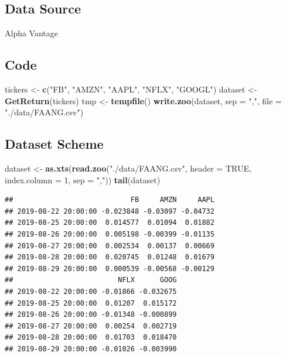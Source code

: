\documentclass[]{book}
\newenvironment{Shaded}{\begin{snugshade}}{\end{snugshade}}
\newcommand{\KeywordTok}[1]{\textcolor[rgb]{0.13,0.29,0.53}{\textbf{#1}}}
\newcommand{\DataTypeTok}[1]{\textcolor[rgb]{0.13,0.29,0.53}{#1}}
\newcommand{\DecValTok}[1]{\textcolor[rgb]{0.00,0.00,0.81}{#1}}
\newcommand{\StringTok}[1]{\textcolor[rgb]{0.31,0.60,0.02}{#1}}
\newcommand{\OtherTok}[1]{\textcolor[rgb]{0.56,0.35,0.01}{#1}}
\newcommand{\NormalTok}[1]{#1}
\theoremstyle{definition}
\theoremstyle{definition}
\theoremstyle{definition}
\theoremstyle{remark}
\begin{document}
\subsection{Data Source}\label{data-source-1}

Alpha Vantage

\subsection{Code}\label{code-1}

\begin{Shaded}
\begin{Highlighting}[]
\NormalTok{tickers <-}\StringTok{ }\KeywordTok{c}\NormalTok{(}\StringTok{"FB"}\NormalTok{, }\StringTok{"AMZN"}\NormalTok{, }\StringTok{"AAPL"}\NormalTok{, }\StringTok{"NFLX"}\NormalTok{, }\StringTok{"GOOGL"}\NormalTok{)}
\NormalTok{dataset <-}\StringTok{ }\KeywordTok{GetReturn}\NormalTok{(tickers)}
\NormalTok{tmp <-}\StringTok{ }\KeywordTok{tempfile}\NormalTok{()}
\KeywordTok{write.zoo}\NormalTok{(dataset, }\DataTypeTok{sep =} \StringTok{","}\NormalTok{, }\DataTypeTok{file =} \StringTok{"./data/FAANG.csv"}\NormalTok{)}
\end{Highlighting}
\end{Shaded}

\subsection{Dataset Scheme}\label{dataset-scheme-1}

\begin{Shaded}
\begin{Highlighting}[]
\NormalTok{dataset <-}\StringTok{ }\KeywordTok{as.xts}\NormalTok{(}\KeywordTok{read.zoo}\NormalTok{(}\StringTok{"./data/FAANG.csv"}\NormalTok{, }\DataTypeTok{header =} \OtherTok{TRUE}\NormalTok{, }
  \DataTypeTok{index.column =} \DecValTok{1}\NormalTok{, }\DataTypeTok{sep =} \StringTok{","}\NormalTok{))}
\KeywordTok{tail}\NormalTok{(dataset)}
\end{Highlighting}
\end{Shaded}

\begin{verbatim}
##                            FB     AMZN     AAPL
## 2019-08-22 20:00:00 -0.023848 -0.03097 -0.04732
## 2019-08-25 20:00:00  0.014577  0.01094  0.01882
## 2019-08-26 20:00:00  0.005198 -0.00399 -0.01135
## 2019-08-27 20:00:00  0.002534  0.00137  0.00669
## 2019-08-28 20:00:00  0.020745  0.01248  0.01679
## 2019-08-29 20:00:00  0.000539 -0.00568 -0.00129
##                         NFLX      GOOG
## 2019-08-22 20:00:00 -0.01866 -0.032675
## 2019-08-25 20:00:00  0.01207  0.015172
## 2019-08-26 20:00:00 -0.01348 -0.000899
## 2019-08-27 20:00:00  0.00254  0.002719
## 2019-08-28 20:00:00  0.01703  0.018470
## 2019-08-29 20:00:00 -0.01026 -0.003990
\end{verbatim}


\end{document}
